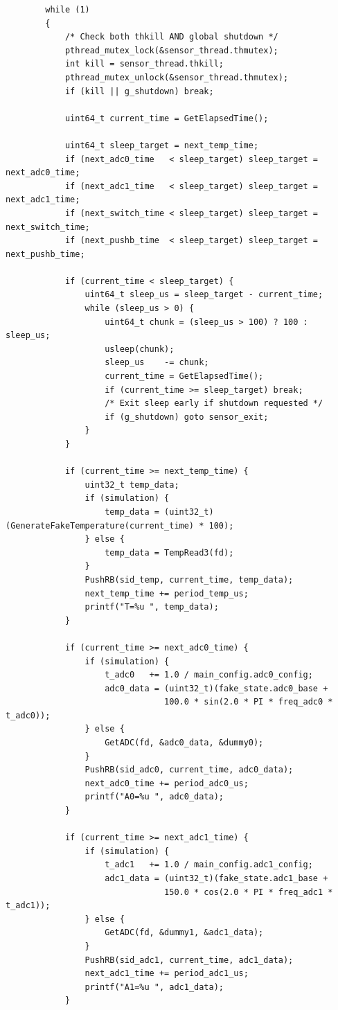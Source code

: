 \begin{verbatim}
        while (1)
        {
            /* Check both thkill AND global shutdown */
            pthread_mutex_lock(&sensor_thread.thmutex);
            int kill = sensor_thread.thkill;
            pthread_mutex_unlock(&sensor_thread.thmutex);
            if (kill || g_shutdown) break;
    
            uint64_t current_time = GetElapsedTime();
    
            uint64_t sleep_target = next_temp_time;
            if (next_adc0_time   < sleep_target) sleep_target = next_adc0_time;
            if (next_adc1_time   < sleep_target) sleep_target = next_adc1_time;
            if (next_switch_time < sleep_target) sleep_target = next_switch_time;
            if (next_pushb_time  < sleep_target) sleep_target = next_pushb_time;
    
            if (current_time < sleep_target) {
                uint64_t sleep_us = sleep_target - current_time;
                while (sleep_us > 0) {
                    uint64_t chunk = (sleep_us > 100) ? 100 : sleep_us;
                    usleep(chunk);
                    sleep_us    -= chunk;
                    current_time = GetElapsedTime();
                    if (current_time >= sleep_target) break;
                    /* Exit sleep early if shutdown requested */
                    if (g_shutdown) goto sensor_exit;
                }
            }
    
            if (current_time >= next_temp_time) {
                uint32_t temp_data;
                if (simulation) {
                    temp_data = (uint32_t)(GenerateFakeTemperature(current_time) * 100);
                } else {
                    temp_data = TempRead3(fd);
                }
                PushRB(sid_temp, current_time, temp_data);
                next_temp_time += period_temp_us;
                printf("T=%u ", temp_data);
            }
    
            if (current_time >= next_adc0_time) {
                if (simulation) {
                    t_adc0   += 1.0 / main_config.adc0_config;
                    adc0_data = (uint32_t)(fake_state.adc0_base +
                                100.0 * sin(2.0 * PI * freq_adc0 * t_adc0));
                } else {
                    GetADC(fd, &adc0_data, &dummy0);
                }
                PushRB(sid_adc0, current_time, adc0_data);
                next_adc0_time += period_adc0_us;
                printf("A0=%u ", adc0_data);
            }
    
            if (current_time >= next_adc1_time) {
                if (simulation) {
                    t_adc1   += 1.0 / main_config.adc1_config;
                    adc1_data = (uint32_t)(fake_state.adc1_base +
                                150.0 * cos(2.0 * PI * freq_adc1 * t_adc1));
                } else {
                    GetADC(fd, &dummy1, &adc1_data);
                }
                PushRB(sid_adc1, current_time, adc1_data);
                next_adc1_time += period_adc1_us;
                printf("A1=%u ", adc1_data);
            }
    

\end{verbatim}
